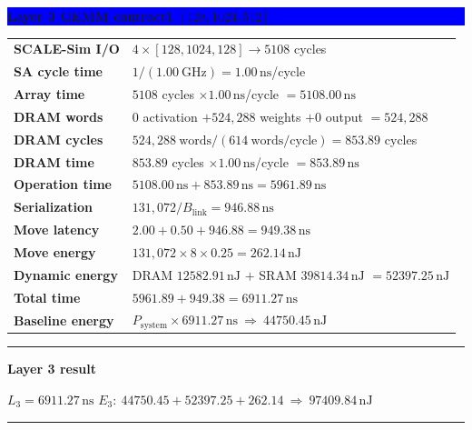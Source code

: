 \documentclass[10pt]{article}
\newcommand{\ns}{\,\mathrm{ns}}
\newcommand{\nj}{\,\mathrm{nJ}}
\newenvironment{resultbox}[1]
  {\begin{center}\begin{minipage}{0.93\linewidth}\color{green}
   \hrule height 1pt\vspace{0.35em}\textbf{#1}\par\smallskip\color{black}}
  {\vspace{0.25em}\color{green}\hrule height 1pt\end{minipage}\end{center}}
\newcommand{\layerbar}[1]{\vspace{0.35em}\noindent
  \colorbox{blue}{\parbox{\dimexpr\linewidth-2\fboxsep\relax}{
  \color{white}\bfseries #1}}\par\vspace{0.2em}}
\begin{document}
\newpage
\layerbar{Layer 3 \quad GEMM contract1 \quad $[128,1024,512]$}
\begin{tabularx}{\linewidth}{@{}L Y@{}}
\textbf{SCALE-Sim I/O} & $4\times[128,1024,128]\rightarrow5108$ cycles \\
\textbf{SA cycle time} & $1/(1.00\ \mathrm{GHz})=1.00\ns$/cycle \\
\textbf{Array time} & $5108$ cycles $\times1.00\ns$/cycle $=5108.00\ns$ \\
\textbf{DRAM words} & $0$ activation $+524{,}288$ weights $+0$ output $=524{,}288$ \\
\textbf{DRAM cycles} & $524{,}288\ \mathrm{words}/(614\ \mathrm{words/cycle})=853.89$ cycles \\
\textbf{DRAM time} & $853.89$ cycles $\times1.00\ns$/cycle $=853.89\ns$ \\
\textbf{Operation time} & $5108.00\ns+853.89\ns=5961.89\ns$ \\
\textbf{Serialization} & $131{,}072/B_{\mathrm{link}}=946.88\ns$ \\
\textbf{Move latency} & $2.00+0.50+946.88=949.38\ns$ \\
\textbf{Move energy} & $131{,}072\times8\times0.25=262.14\nj$ \\
\textbf{Dynamic energy} & DRAM $12582.91\nj$ $+$ SRAM $39814.34\nj$ $=52397.25\nj$ \\
\textbf{Total time} & $5961.89+949.38=6911.27\ns$ \\
\textbf{Baseline energy} & $P_{\mathrm{system}}\times6911.27\ns\ \Longrightarrow\ 44750.45\nj$ \\
\bottomrule
\end{tabularx}
\begin{resultbox}{Layer 3 result}
$L_3=6911.27\ns$ \hfill $E_3:\ 44750.45+52397.25+262.14\ \Longrightarrow\ 97409.84\nj$
\end{resultbox}
\end{document}
